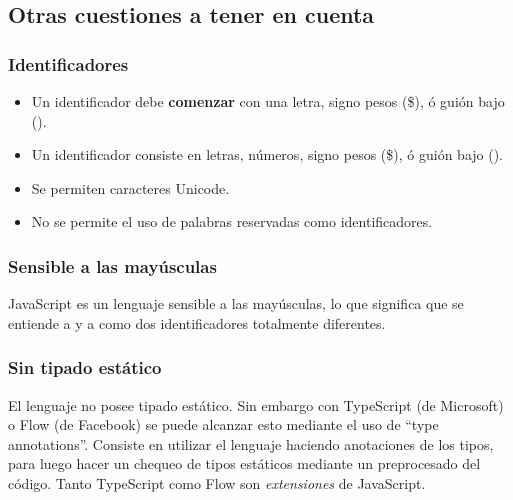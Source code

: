 \subsection{Otras cuestiones a tener en cuenta}

\subsubsection{Identificadores}

\begin{itemize}
\item Un identificador debe \textbf{comenzar} con una letra, signo pesos (\$), ó guión bajo (\textunderscore).
\item Un identificador consiste en letras, números, signo pesos (\$), ó guión bajo (\textunderscore).
\item Se permiten caracteres Unicode.
\item No se permite el uso de palabras reservadas como identificadores.
\end{itemize}

\subsubsection{Sensible a las mayúsculas}

JavaScript es un lenguaje sensible a las mayúsculas, lo que significa que se entiende a  y a  como dos identificadores totalmente diferentes.

\subsubsection{Sin tipado estático}

El lenguaje no posee tipado estático. Sin embargo con TypeScript (de Microsoft) o Flow (de Facebook) se puede alcanzar esto mediante el uso de "`type annotations"'. Consiste en utilizar el lenguaje haciendo anotaciones de los tipos, para luego hacer un chequeo de tipos estáticos mediante un preprocesado del código. Tanto TypeScript como Flow son \textit{extensiones} de JavaScript. 
